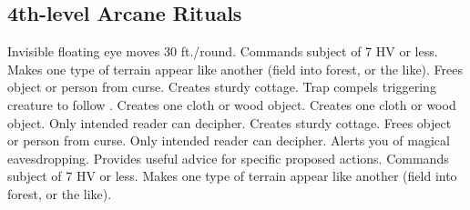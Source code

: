 \subsection{4th-level Arcane Rituals}
\begin{rituallist}
   Invisible floating eye moves 30 ft./round.
   Commands subject of 7 HV or less.
   Makes one type of terrain appear like another (field into forest, or the like).
   Frees object or person from curse.
   Creates sturdy cottage.
   Trap compels triggering creature to follow .
   Creates one cloth or wood object.
   Creates one cloth or wood object.
   Only intended reader can decipher.
   Creates sturdy cottage.
   Frees object or person from curse.
   Only intended reader can decipher.
   Alerts you of magical eavesdropping.
   Provides useful advice for specific proposed actions.
   Commands subject of 7 HV or less.
   Makes one type of terrain appear like another (field into forest, or the like).
\end{rituallist}

